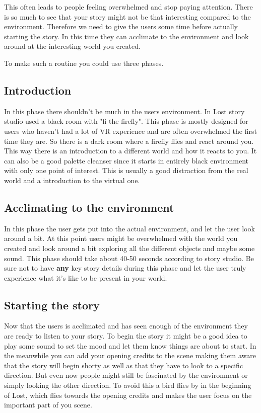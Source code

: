 \documentclass{report}
\begin{document}
				This often leads to people feeling overwhelmed and stop paying attention. There is so much to see that your story might not be that interesting compared to the environment. Therefore we need to give the users some time before actually starting the story. In this time they can acclimate to the environment and look around at the interesting world you created.
				
				To make such a routine you could use three phases.
				
				\subsection{Introduction}
				In this phase there shouldn't be much in the users environment. In Lost story studio used a black room with "fi the firefly". This phase is mostly designed for users who haven't had a lot of VR experience and are often overwhelmed the first time they are. So there is a dark room where a firefly flies and react around you. This way there is an introduction to a different world and how it reacts to you. It can also be a good palette cleanser since it starts in entirely black environment with only one point of interest. This is usually a good distraction from the real world and a introduction to the virtual one.
				
				\subsection{Acclimating to the environment}
				In this phase the user gets put into the actual environment, and let the user look around a bit. At this point users might be overwhelmed with the world you created and look around a bit exploring all the different objects and maybe some sound. This phase should take about 40-50 seconds according to story studio. Be sure not to have \textbf{any} key story details during this phase and let the user truly experience what it's like to be present in your world.
				
				\subsection{Starting the story}
				Now that the users is acclimated and has seen enough of the environment they are ready to listen to your story. To begin the story it might be a good idea to play some sound to set the mood and let them know things are about to start. In the meanwhile you can add your opening credits to the scene making them aware that the story will begin shorty as well as that they have to look to a specific direction. But even now people might still be fascinated by the environment or simply looking the other direction. To avoid this a bird flies by in the beginning of Lost, which flies towards the opening credits and makes the user focus on the important part of you scene.
				
\end{document}
